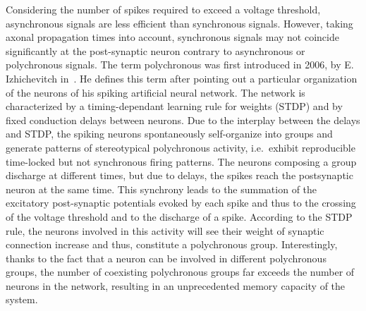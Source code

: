 \documentclass[brainsci, %
               review,submit,pdftex,moreauthors%
               ]{Definitions/mdpi}
\begin{document}

Considering the number of spikes required to exceed a voltage threshold, asynchronous signals are less efficient than synchronous signals. However, taking axonal propagation times into account, synchronous signals may not coincide significantly at the post-synaptic neuron contrary to asynchronous or polychronous signals. The term polychronous was first introduced in 2006, by E. Izhichevitch in~\citep{izhikevich_polychronization_2006}. He defines this term after pointing out a particular organization of the neurons of his spiking artificial neural network. The network is characterized by a timing-dependant learning rule for weights (STDP) and by fixed conduction delays between neurons. Due to the interplay between the delays and STDP, the spiking neurons spontaneously self-organize into groups and generate patterns of stereotypical polychronous activity, i.e.~exhibit reproducible time-locked but not synchronous firing patterns. The neurons composing a group discharge at different times, but due to delays, the spikes reach the postsynaptic neuron at the same time. This synchrony leads to the summation of the excitatory post-synaptic potentials evoked by each spike and thus to the crossing of the voltage threshold and to the discharge of a spike. According to the STDP rule, the neurons involved in this activity will see their weight of synaptic connection increase and thus, constitute a polychronous group. Interestingly, thanks to the fact that a neuron can be involved in different polychronous groups, the number of coexisting polychronous groups far exceeds the number of neurons in the network, resulting in an unprecedented memory capacity of the system.
\end{document}
